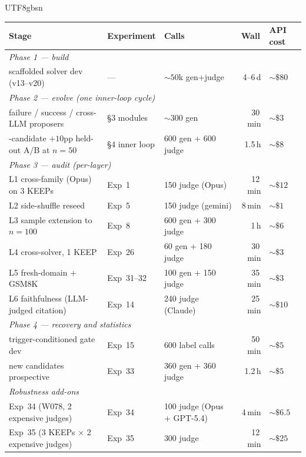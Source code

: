 \documentclass{article}
\begin{document}
\begin{CJK*}{UTF8}{gbsn}
\begin{table}[h]
\centering\small
\setlength{\tabcolsep}{4pt}
\begin{tabular}{l l l r l}
\toprule
Stage & Experiment & Calls & \multicolumn{1}{c}{Wall} & API cost \\
\midrule
\multicolumn{5}{l}{\emph{Phase 1 — build}}\\
\quad scaffolded solver dev (v13--v20)
  & --- & ${\sim}50$k gen+judge & 4--6\,d & \(\sim\$80\) \\
\midrule
\multicolumn{5}{l}{\emph{Phase 2 — evolve (one inner-loop cycle)}}\\
\quad failure / success / cross-LLM proposers
  & §3 modules & ${\sim}300$ gen & 30\,min & \(\sim\$3\) \\
\quad 12-candidate $+10$pp held-out A/B at $n=50$
  & §4 inner loop & 600 gen + 600 judge & 1.5\,h & \(\sim\$8\) \\
\midrule
\multicolumn{5}{l}{\emph{Phase 3 — audit (per-layer)}}\\
\quad L1 cross-family (Opus) on 3 KEEPs
  & Exp~1 & 150 judge (Opus) & 12\,min & \(\sim\$12\) \\
\quad L2 side-shuffle reseed
  & Exp~5 & 150 judge (gemini) & 8\,min & \(\sim\$1\) \\
\quad L3 sample extension to $n{=}100$
  & Exp~8 & 600 gen + 300 judge & 1\,h & \(\sim\$6\) \\
\quad L4 cross-solver, 1 KEEP
  & Exp~26 & 60 gen + 180 judge & 30\,min & \(\sim\$3\) \\
\quad L5 fresh-domain + GSM8K
  & Exp~31--32 & 100 gen + 150 judge & 35\,min & \(\sim\$3\) \\
\quad L6 faithfulness (LLM-judged citation)
  & Exp~14 & 240 judge (Claude) & 25\,min & \(\sim\$10\) \\
\midrule
\multicolumn{5}{l}{\emph{Phase 4 — recovery and statistics}}\\
\quad trigger-conditioned gate dev
  & Exp~15 & 600 label calls & 50\,min & \(\sim\$5\) \\
\quad 9 new candidates prospective
  & Exp~33 & 360 gen + 360 judge & 1.2\,h & \(\sim\$5\) \\
\midrule
\multicolumn{5}{l}{\emph{Robustness add-ons}}\\
\quad Exp~34 (W078, 2 expensive judges)
  & Exp~34 & 100 judge (Opus + GPT-5.4) & 4\,min & \(\sim\$6.5\) \\
\quad Exp~35 (3 KEEPs $\times$ 2 expensive judges)
  & Exp~35 & 300 judge & 12\,min & \(\sim\$25\) \\

\end{tabular}
\end{table}
\end{CJK*}
\end{document}
